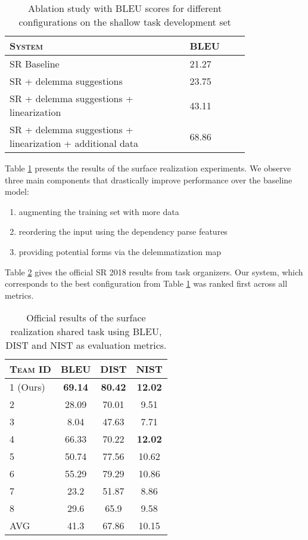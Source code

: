 \documentclass[11pt,a4paper]{article}
\begin{document}
\begin{table}[!ht]
\centering
\begin{tabular}{p{0.6\linewidth}p{0.2\linewidth}}
\toprule
\textsc{System} & \textsc{BLEU} \\ \midrule
SR Baseline & 21.27 \\
SR + delemma suggestions & 23.75 \\
SR + delemma suggestions + linearization & 43.11 \\
SR + delemma suggestions + linearization + additional data & 68.86 \\
\bottomrule
\end{tabular}
\caption{Ablation study with BLEU scores for different configurations on the shallow task development set}
\label{tab:ablation-results}
\end{table}

Table \ref{tab:ablation-results} presents the results of the surface realization experiments. We observe three main components that drastically improve performance over the baseline model:

\begin{enumerate}
    \item augmenting the training set with more data
    \item reordering the input using the dependency parse features
    \item providing potential forms via the delemmatization map
\end{enumerate}

Table \ref{tab:srst-official-results} gives the official SR 2018 results from task organizers. Our system, which corresponds to the best configuration from Table \ref{tab:ablation-results} was ranked first across all metrics. 

\begin{table}[!ht]
\centering
\begin{tabular}{lccc}
\toprule
\textsc{Team ID} & \textsc{BLEU} & \textsc{DIST} & \textsc{NIST} \\ \midrule
1 (Ours) & \textbf{69.14} & \textbf{80.42} & \textbf{12.02} \\
2 & 28.09 & 70.01 & 9.51 \\ 
3 & 8.04 & 47.63 &  7.71 \\
4 & 66.33 & 70.22 & \textbf{12.02} \\
5 & 50.74 & 77.56 & 10.62 \\
6 & 55.29 & 79.29 & 10.86 \\
7 & 23.2 & 51.87  & 8.86 \\
8 & 29.6 & 65.9  & 9.58  \\
\midrule
AVG & 41.3 & 67.86 & 10.15 \\
\bottomrule
\end{tabular}
\caption{Official results of the surface realization shared task using BLEU, DIST and NIST as evaluation metrics.}
\label{tab:srst-official-results}
\end{table}
\end{document}
